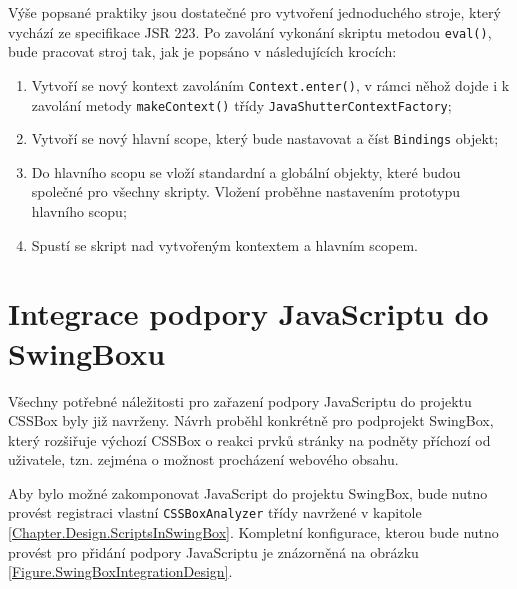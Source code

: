 Výše popsané praktiky jsou dostatečné pro vytvoření jednoduchého stroje, který vychází ze specifikace JSR 223.  Po zavolání vykonání skriptu metodou \texttt{eval()}, bude pracovat stroj tak, jak je popsáno v následujících krocích:  

\begin{enumerate}
  \item	Vytvoří se nový kontext zavoláním \texttt{Context.enter()}, v rámci něhož dojde i k zavolání metody \texttt{makeContext()} třídy \texttt{JavaShutterContextFactory};
  \item	Vytvoří se nový hlavní scope, který bude nastavovat a číst \texttt{Bindings} objekt;
  \item	Do hlavního scopu se vloží standardní a globální objekty, které budou společné pro všechny skripty. Vložení proběhne nastavením prototypu hlavního scopu;
  \item	Spustí se skript nad vytvořeným kontextem a hlavním scopem.
\end{enumerate}

\section{Integrace podpory JavaScriptu do SwingBoxu}
\label{Chapter.Design.SwingBoxIntegration}

Všechny potřebné náležitosti pro zařazení podpory JavaScriptu do projektu CSSBox byly již navrženy. Návrh proběhl konkrétně pro podprojekt SwingBox, který rozšiřuje výchozí  CSSBox o reakci prvků stránky na podněty příchozí od uživatele, tzn. zejména o možnost procházení webového obsahu. 

Aby bylo možné zakomponovat JavaScript do projektu SwingBox, bude nutno provést registraci vlastní \texttt{CSSBoxAnalyzer} třídy navržené v kapitole \ref{Chapter.Design.ScriptsInSwingBox}. Kompletní konfigurace, kterou bude nutno provést pro přidání podpory JavaScriptu je znázorněná na obrázku \ref{Figure.SwingBoxIntegrationDesign}.


